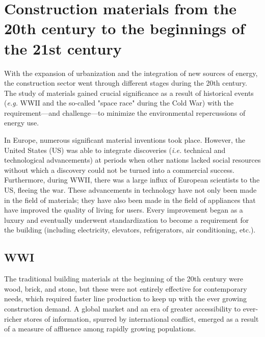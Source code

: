 \section{Construction materials from the 20th century to the beginnings of the 21st century}
\label{sec:construction_materials}

With the expansion of urbanization and the integration of new sources of energy, the construction sector went through different stages during the 20th century. The study of materials gained crucial significance as a result of historical events (\textit{e.g.} WWII and the so-called "space race" during the Cold War) with the requirement—and challenge—to minimize the environmental repercussions of energy use.\autocite{smil2000energy}

In Europe, numerous significant material inventions took place. However, the United States (US) was able to integrate discoveries (\textit{i.e.} technical and technological advancements) at periods when other nations lacked social resources without which a discovery could not be turned into a commercial success.\autocite{buchanan2019history} Furthermore, during WWII, there was a large influx of European scientists to the US, fleeing the war.\autocite{lepage2015atlas} These advancements in technology have not only been made in the field of materials; they have also been made in the field of appliances that have improved the quality of living for users. Every improvement began as a luxury and eventually underwent standardization to become a requirement for the building (including electricity, elevators, refrigerators, air conditioning, etc.).

\subsection{WWI}
\label{sec:wwi}

The traditional building materials at the beginning of the 20th century were wood, brick, and stone, but these were not entirely effective for contemporary needs,\autocite{jester2014twentieth} which required faster line production to keep up with the ever growing construction demand. A global market and an era of greater accessibility to ever-richer stores of information,\autocite{smil2000energy} spurred by international conflict, emerged as a result of a measure of affluence among rapidly growing populations. 

